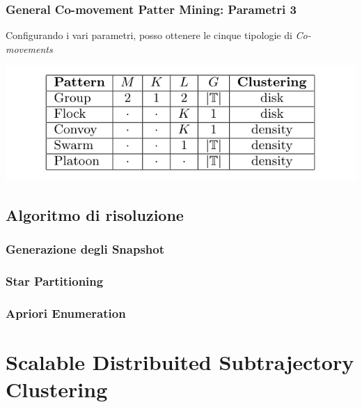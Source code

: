 \documentclass{beamer}
\begin{document}
\begin{frame}
\frametitle{General Co-movement Patter Mining: Parametri 3}

Configurando i vari parametri, posso ottenere le cinque tipologie di \textit{Co-movements}

\begin{center}
\includegraphics[scale=0.4]{ParametersConfiguration} 
\end{center}

\end{frame}



\subsection{Algoritmo di risoluzione}

\subsubsection{Generazione degli Snapshot}

\subsubsection{Star Partitioning}

\subsubsection{Apriori Enumeration}

\section{Scalable Distribuited Subtrajectory Clustering}




\begin{frame}
\titlepage %
\end{frame}

\end{document}
